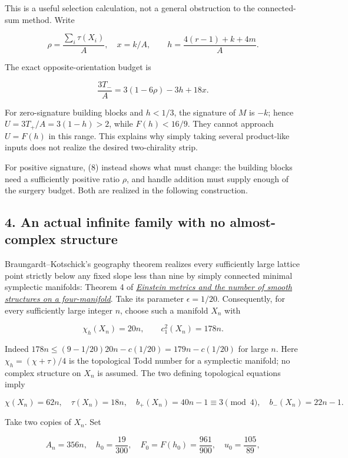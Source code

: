\documentclass[
  11pt,
]{article}
\begin{document}
This is a useful selection calculation, not a general obstruction to the
connected-sum method. Write

\[
 \rho=\frac{\sum_i\tau(X_i)}A,\quad x=k/A,
 \qquad h=\frac{4(r-1)+k+4m}A.
\]

The exact opposite-orientation budget is

\[
 \frac{3T_-}A=3(1-6\rho)-3h+18x.
 \tag{8}
\]

For zero-signature building blocks and \(h<1/3\), the signature of \(M\)
is \(-k\); hence \(U=3T_+/A=3(1-h)>2\), while \(F(h)<16/9\). They cannot
approach \(U=F(h)\) in this range. This explains why simply taking
several product-like inputs does not realize the desired two-chirality
strip.

For positive signature, (8) instead shows what must change: the building
blocks need a sufficiently positive ratio \(\rho\), and handle addition
must supply enough of the surgery budget. Both are realized in the
following construction.

\hypertarget{an-actual-infinite-family-with-no-almost-complex-structure}{%
\subsection{4. An actual infinite family with no almost-complex
structure}\label{an-actual-infinite-family-with-no-almost-complex-structure}}

Braungardt--Kotschick's geography theorem realizes every sufficiently
large lattice point strictly below any fixed slope less than nine by
simply connected minimal symplectic manifolds: Theorem 4 of
\href{https://arxiv.org/pdf/math/0306021}{\emph{Einstein metrics and the
number of smooth structures on a four-manifold}}. Take its parameter
\(\epsilon=1/20\). Consequently, for every sufficiently large integer
\(n\), choose such a manifold \(X_n\) with

\[
 \chi_h(X_n)=20n,\qquad c_1^2(X_n)=178n.
 \tag{9}
\]

Indeed \(178n\le(9-1/20)20n-c(1/20)=179n-c(1/20)\) for large \(n\). Here
\(\chi_h=(\chi+\tau)/4\) is the topological Todd number for a symplectic
manifold; no complex structure on \(X_n\) is assumed. The two defining
topological equations imply

\[
 \chi(X_n)=62n,\quad \tau(X_n)=18n,\quad
 b_+(X_n)=40n-1\equiv3\pmod4,\quad b_-(X_n)=22n-1.
 \tag{10}
\]

Take two copies of \(X_n\). Set

\[
 A_n=356n,\quad h_0=\frac{19}{300},\quad F_0=F(h_0)=\frac{961}{900},
 \quad u_0=\frac{105}{89},
\]
\end{document}
